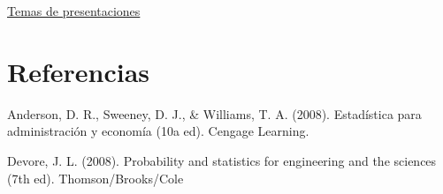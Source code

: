 \documentclass[
]{book}
\begin{document}
\href{https://correouss-my.sharepoint.com/:f:/r/personal/imaldonadoc1_docente_uss_cl/Documents/doc/temas?csf=1\&web=1}{Temas de presentaciones}

\hypertarget{referencias}{%
\chapter*{Referencias}\label{referencias}}

Anderson, D. R., Sweeney, D. J., \& Williams, T. A. (2008). Estadística para administración y economía (10a ed). Cengage Learning.

Devore, J. L. (2008). Probability and statistics for engineering and the sciences (7th ed). Thomson/Brooks/Cole

  
\end{document}
